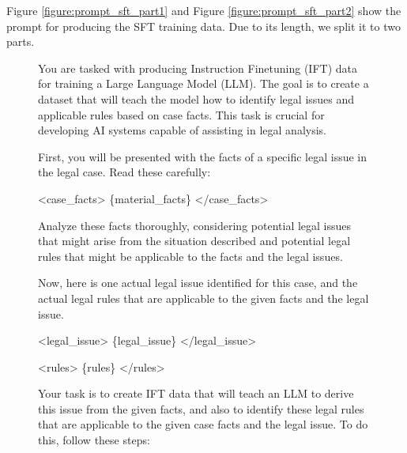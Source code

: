 Figure \ref{figure:prompt_sft_part1} and Figure \ref{figure:prompt_sft_part2} show the prompt for producing the SFT training data. Due to its length, we split it to two parts.
\begin{figure}[htbp]
\begin{tcolorbox}[enhanced,colback=orange!5!white,colframe=orange!75!black,title=Prompt for Generating the SFT Training Data (Part I)]

\raggedright

You are tasked with producing Instruction Finetuning (IFT) data for training a Large Language Model (LLM). The goal is to create a dataset that will teach the model how to identify legal issues and applicable rules based on case facts. This task is crucial for developing AI systems capable of assisting in legal analysis.\newline

First, you will be presented with the facts of a specific legal issue in the legal case. Read these carefully:\newline

<case\_facts>\newline
\{material\_facts\}\newline
</case\_facts>\newline

Analyze these facts thoroughly, considering potential legal issues that might arise from the situation described and potential legal rules that might be applicable to the facts and the legal issues.\newline

Now, here is one actual legal issue identified for this case, and the actual legal rules that are applicable to the given facts and the legal issue.\newline

<legal\_issue>\newline
\{legal\_issue\}\newline
</legal\_issue>\newline

<rules>\newline
\{rules\}\newline
</rules>\newline

Your task is to create IFT data that will teach an LLM to derive this issue from the given facts, and also to identify these legal rules that are applicable to the given case facts and the legal issue. To do this, follow these steps:\newline


\end{tcolorbox}
\end{figure}
